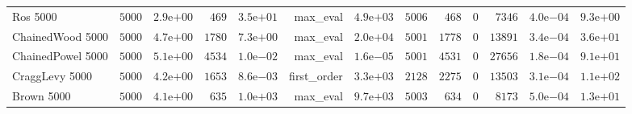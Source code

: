 \begin{longtable}[c]{lrrrrrrrrrrrr}
Ros 5000 & \( 5000\) & \( 2.9\)e\(+00\) & \(  469\) & \( 3.5\)e\(+01\) & max\_eval & \( 4.9\)e\(+03\) & \( 5006\) & \(  468\) & \(    0\) & \( 7346\) & \( 4.0\)e\(-04\) & \( 9.3\)e\(+00\) \\
ChainedWood 5000 & \( 5000\) & \( 4.7\)e\(+00\) & \( 1780\) & \( 7.3\)e\(+00\) & max\_eval & \( 2.0\)e\(+04\) & \( 5001\) & \( 1778\) & \(    0\) & \(13891\) & \( 3.4\)e\(-04\) & \( 3.6\)e\(+01\) \\
ChainedPowel 5000 & \( 5000\) & \( 5.1\)e\(+00\) & \( 4534\) & \( 1.0\)e\(-02\) & max\_eval & \( 1.6\)e\(-05\) & \( 5001\) & \( 4531\) & \(    0\) & \(27656\) & \( 1.8\)e\(-04\) & \( 9.1\)e\(+01\) \\
CraggLevy 5000 & \( 5000\) & \( 4.2\)e\(+00\) & \( 1653\) & \( 8.6\)e\(-03\) & first\_order & \( 3.3\)e\(+03\) & \( 2128\) & \( 2275\) & \(    0\) & \(13503\) & \( 3.1\)e\(-04\) & \( 1.1\)e\(+02\) \\
Brown 5000 & \( 5000\) & \( 4.1\)e\(+00\) & \(  635\) & \( 1.0\)e\(+03\) & max\_eval & \( 9.7\)e\(+03\) & \( 5003\) & \(  634\) & \(    0\) & \( 8173\) & \( 5.0\)e\(-04\) & \( 1.3\)e\(+01\) \\
\hline 
\end{longtable}



